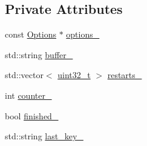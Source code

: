 \subsection*{Private Attributes}
\begin{DoxyCompactItemize}
\item 
const \hyperlink{structleveldb_1_1_options}{Options} $\ast$ \hyperlink{classleveldb_1_1_block_builder_ac3f2a6bc77ee0f695192c54465d59e92}{options\-\_\-}
\item 
std\-::string \hyperlink{classleveldb_1_1_block_builder_a1f9aa245988ddb04590fc863fd51210e}{buffer\-\_\-}
\item 
std\-::vector$<$ \hyperlink{stdint_8h_a435d1572bf3f880d55459d9805097f62}{uint32\-\_\-t} $>$ \hyperlink{classleveldb_1_1_block_builder_ae3eedf26b4ac597e5190bef0c6b75179}{restarts\-\_\-}
\item 
int \hyperlink{classleveldb_1_1_block_builder_aeaa73f33ffc96b7bf54f8d1c88fe730a}{counter\-\_\-}
\item 
bool \hyperlink{classleveldb_1_1_block_builder_a15fd67e3114b72c9a27c9309f8ca97f8}{finished\-\_\-}
\item 
std\-::string \hyperlink{classleveldb_1_1_block_builder_a546acee0fa90a8e9585f8d369aaf09f3}{last\-\_\-key\-\_\-}
\end{DoxyCompactItemize}


